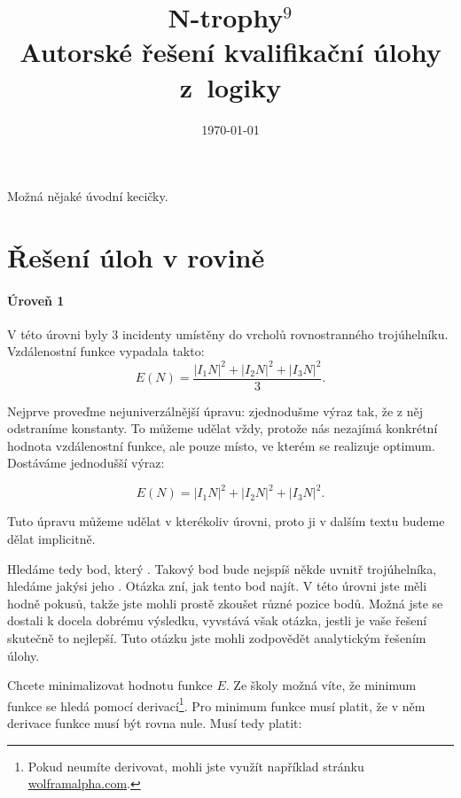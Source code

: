 \documentclass[12pt,a4paper]{article}
\begin{document}
\pagestyle{fancy}     %
\setcounter{page}{1}  %

\fancyhead[R]{}

\title{N-trophy$^9$\\Autorské řešení kvalifikační úlohy z~logiky}
\date{\today}
\maketitle

\setlength{\parindent}{0cm}
\setlength{\parskip}{3mm plus2pt minus2pt}

Možná nějaké úvodní kecičky.

\section*{Řešení úloh v rovině}
\paragraph*{Úroveň 1}

V této úrovni byly 3 incidenty umístěny do vrcholů rovnostranného trojúhelníku.
Vzdálenostní funkce vypadala takto:
$$E(N) = \frac{|I_1N|^2 + |I_2N|^2 + |I_3N|^2}{3}.$$

Nejprve proveďme nejuniverzálnější úpravu: zjednodušme výraz tak, že z něj
odstraníme konstanty. To můžeme udělat vždy, protože nás nezajímá konkrétní
hodnota vzdálenostní funkce, ale pouze místo, ve kterém se realizuje optimum.
Dostáváme jednodušší výraz:

$$E(N) = |I_1N|^2 + |I_2N|^2 + |I_3N|^2.$$

Tuto úpravu můžeme udělat v kterékoliv úrovni, proto ji v dalším textu budeme
dělat implicitně.

Hledáme tedy bod, který . Takový bod bude
nejspíš někde uvnitř trojúhelníka, hledáme jakýsi jeho . Otázka zní,
jak tento bod najít. V této úrovni jste měli hodně pokusů, takže jste mohli
prostě zkoušet různé pozice bodů. Možná jste se dostali k docela dobrému
výsledku, vyvstává však otázka, jestli je vaše řešení skutečně to nejlepší.
Tuto otázku jste mohli zodpovědět analytickým řešením úlohy.

Chcete minimalizovat hodnotu funkce $E$. Ze školy možná víte, že minimum
funkce se hledá pomocí derivací\footnote{Pokud neumíte derivovat, mohli jste
využít například stránku \url{wolframalpha.com}.}. Pro minimum funkce musí
platit, že v něm derivace funkce musí být rovna nule. Musí tedy platit:
\end{document}
